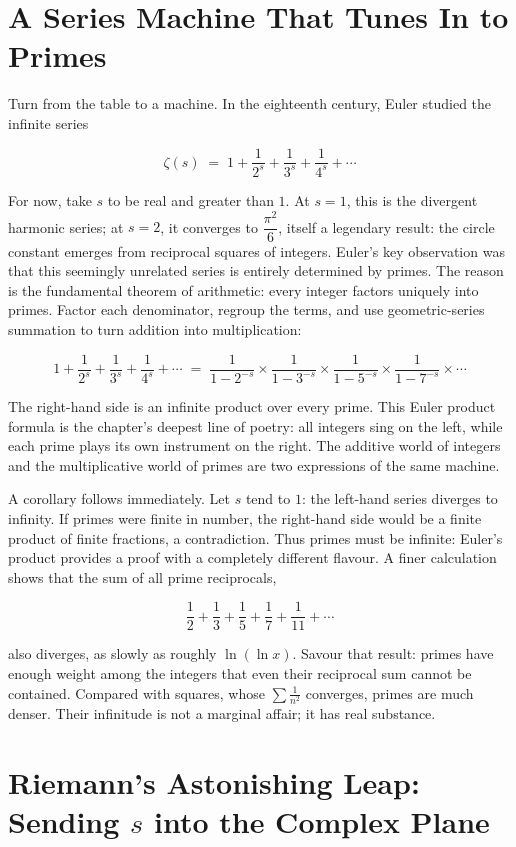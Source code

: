 \section{A Series Machine That Tunes In to Primes}

Turn from the table to a machine. In the eighteenth century, Euler studied the infinite series

\[
\zeta(s)\;=\;1+\frac{1}{2^{s}}+\frac{1}{3^{s}}+\frac{1}{4^{s}}+\cdots
\]

For now, take $s$ to be real and greater than $1$. At $s=1$, this is the divergent harmonic series; at $s=2$, it converges to $\dfrac{\pi^{2}}{6}$, itself a legendary result: the circle constant emerges from reciprocal squares of integers. Euler's key observation was that this seemingly unrelated series is entirely determined by primes. The reason is the fundamental theorem of arithmetic: every integer factors uniquely into primes. Factor each denominator, regroup the terms, and use geometric-series summation to turn addition into multiplication:

\[
1+\frac{1}{2^{s}}+\frac{1}{3^{s}}+\frac{1}{4^{s}}+\cdots
\;=\;
\frac{1}{1-2^{-s}}\times\frac{1}{1-3^{-s}}\times\frac{1}{1-5^{-s}}\times\frac{1}{1-7^{-s}}\times\cdots
\]

The right-hand side is an infinite product over every prime. This Euler product formula is the chapter's deepest line of poetry: all integers sing on the left, while each prime plays its own instrument on the right. The additive world of integers and the multiplicative world of primes are two expressions of the same machine.

A corollary follows immediately. Let $s$ tend to $1$: the left-hand series diverges to infinity. If primes were finite in number, the right-hand side would be a finite product of finite fractions, a contradiction. Thus primes must be infinite: Euler's product provides a proof with a completely different flavour. A finer calculation shows that the sum of all prime reciprocals,

\[
\frac12+\frac13+\frac15+\frac17+\frac1{11}+\cdots
\]

also diverges, as slowly as roughly $\ln(\ln x)$. Savour that result: primes have enough weight among the integers that even their reciprocal sum cannot be contained. Compared with squares, whose $\sum\frac{1}{n^2}$ converges, primes are much denser. Their infinitude is not a marginal affair; it has real substance.

\section{Riemann's Astonishing Leap: Sending $s$ into the Complex Plane}

